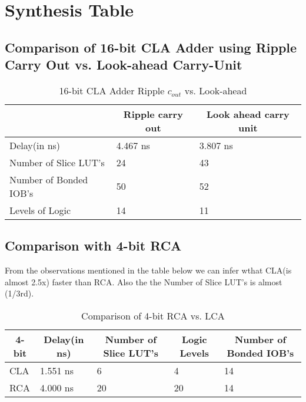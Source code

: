 \section{Synthesis Table}
\subsection{Comparison of 16-bit CLA Adder using Ripple Carry Out vs. Look-ahead Carry-Unit}
\begin{center}
\begin{longtable}{|l|l|l|}
\caption{16-bit CLA Adder Ripple $c_{out}$ vs. Look-ahead }\label{tab:long} \\

\hline 
\multicolumn{1}{|c|}{\textbf{}} & \multicolumn{1}{c|}{\textbf{Ripple carry out}} & \multicolumn{1}{c|}{\textbf{Look ahead carry unit}} \\ \hline 
\endfirsthead
Delay(in ns) & 4.467 ns  & 3.807 ns \\
Number of Slice LUT's & 24 &  43 \\
Number of Bonded IOB's & 50   & 52\\
Levels of Logic & 14 & 11 \\
\hline
\end{longtable}
\end{center}

\subsection{Comparison with 4-bit RCA}
From the observations mentioned in the table below we can infer wthat CLA(is almost 2.5x) faster than RCA. Also the the Number of Slice LUT's is almost (1/3rd).
\begin{center}
\begin{longtable}{|l|l|l|l|l|}
\caption{Comparison of 4-bit RCA vs. LCA }\label{tab:long} \\

\hline \multicolumn{1}{|c|}{\textbf{4-bit}} & \multicolumn{1}{c|}{\textbf{Delay(in ns)}} & \multicolumn{1}{c|}{\textbf{Number of Slice LUT's}} & \multicolumn{1}{c|}{\textbf{Logic Levels}} &
\multicolumn{1}{c|}{\textbf{Number of Bonded IOB's}} \\ \hline 
\endfirsthead
CLA & 1.551 ns & 6 & 4 & 14\\
RCA & 4.000 ns & 20 & 20 & 14\\
\hline
\end{longtable}
\end{center}
